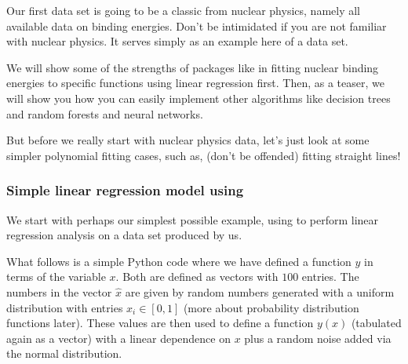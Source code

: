 \documentclass[letterpaper,10pt,english]{sphinxmanual}
\begin{document}
Our first data set is going to be a classic from nuclear physics, namely all
available data on binding energies. Don’t be intimidated if you are not familiar with nuclear physics. It serves simply as an example here of a data set.

We will show some of the
strengths of packages like  in fitting nuclear binding energies to
specific functions using linear regression first. Then, as a teaser, we will show you how
you can easily implement other algorithms like decision trees and random forests and neural networks.

But before we really start with nuclear physics data, let’s just look at some simpler polynomial fitting cases, such as,
(don’t be offended) fitting straight lines!


\subsubsection{Simple linear regression model using }
\label{\detokenize{chapter3:simple-linear-regression-model-using-scikit-learn}}
We start with perhaps our simplest possible example, using  to perform linear regression analysis on a data set produced by us.

What follows is a simple Python code where we have defined a function
\(y\) in terms of the variable \(x\). Both are defined as vectors with  \(100\) entries.
The numbers in the vector \(\hat{x}\) are given
by random numbers generated with a uniform distribution with entries
\(x_i \in [0,1]\) (more about probability distribution functions
later). These values are then used to define a function \(y(x)\)
(tabulated again as a vector) with a linear dependence on \(x\) plus a
random noise added via the normal distribution.
\end{document}
